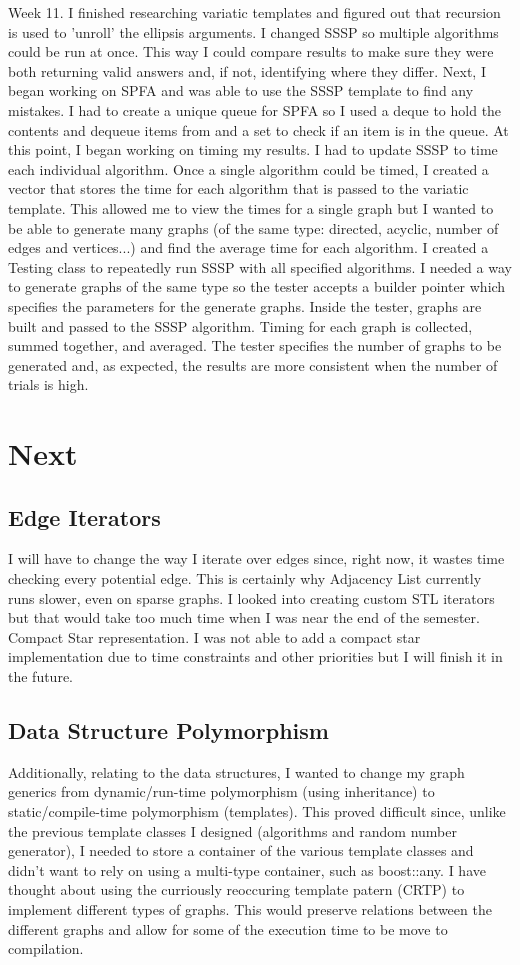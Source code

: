 \documentclass{article}
\begin{document}
Week 11.
I finished researching variatic templates and figured out that recursion is used to 'unroll' the ellipsis arguments. I changed SSSP so multiple algorithms could be run at once. This way I could compare results to make sure they were both returning valid answers and, if not, identifying where they differ. Next, I began working on SPFA and was able to use the SSSP template to find any mistakes. I had to create a unique queue for SPFA so I used a deque to hold the contents and dequeue items from and a set to check if an item is in the queue. At this point, I began working on timing my results. I had to update SSSP to time each individual algorithm. Once a single algorithm could be timed, I created a vector that stores the time for each algorithm that is passed to the variatic template. This allowed me to view the times for a single graph but I wanted to be able to generate many graphs (of the same type: directed, acyclic, number of edges and vertices...) and find the average time for each algorithm. I created a Testing class to repeatedly run SSSP with all specified algorithms. I needed a way to generate graphs of the same type so the tester accepts a builder pointer which specifies the parameters for the generate graphs. Inside the tester, graphs are built and passed to the SSSP algorithm. Timing for each graph is collected, summed together, and averaged. The tester specifies the number of graphs to be generated and, as expected, the results are more consistent when the number of trials is high.

\section{Next}
\subsection{Edge Iterators}
I will have to change the way I iterate over edges since, right now, it wastes time checking every potential edge. This is certainly why Adjacency List currently runs slower, even on sparse graphs. I looked into creating custom STL iterators but that would take too much time when I was near the end of the semester. Compact Star representation. I was not able to add a compact star implementation due to time constraints and other priorities but I will finish it in the future. 

\subsection{Data Structure Polymorphism}
Additionally, relating to the data structures, I wanted to change my graph generics from dynamic/run-time polymorphism (using inheritance) to static/compile-time polymorphism (templates). This proved difficult since, unlike the previous template classes I designed (algorithms and random number generator), I needed to store a container of the various template classes and didn't want to rely on using a multi-type container, such as boost::any. 
I have thought about using the curriously reoccuring template patern (CRTP) to implement different types of graphs. This would preserve relations between the different graphs and allow for some of the execution time to be move to compilation.
\end{document}

